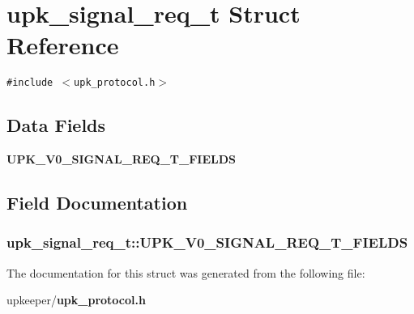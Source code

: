 \section{upk\_\-signal\_\-req\_\-t Struct Reference}
\label{structupk__signal__req__t}
{\tt \#include $<$upk\_\-protocol.h$>$}

\subsection*{Data Fields}
\begin{CompactItemize}
\item 
\bf{UPK\_\-V0\_\-SIGNAL\_\-REQ\_\-T\_\-FIELDS}
\end{CompactItemize}


\subsection{Field Documentation}
\subsubsection{\setlength{\rightskip}{0pt plus 5cm}\bf{upk\_\-signal\_\-req\_\-t::UPK\_\-V0\_\-SIGNAL\_\-REQ\_\-T\_\-FIELDS}}\label{structupk__signal__req__t_b47a7960dd4cee83e292745e2c600618}




The documentation for this struct was generated from the following file:\begin{CompactItemize}
\item 
upkeeper/\bf{upk\_\-protocol.h}\end{CompactItemize}
